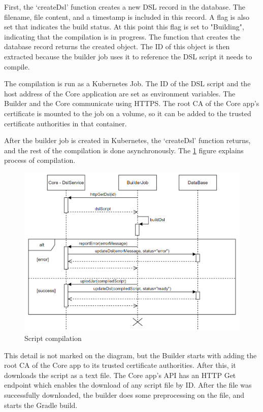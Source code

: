 First, the `createDsl' function creates a new DSL record in the database. The filename, file content, and a timestamp is included in this record. A flag is also set that indicates the build status. At this point this flag is set to "Building", indicating that the compilation is in progress. The function that creates the database record returns the created object. The ID of this object is then extracted because the builder job uses it to reference the DSL script it needs to compile.

The compilation is run as a Kubernetes Job. The ID of the DSL script and the host address of the Core application are set as environment variables. The Builder and the Core communicate using HTTPS. The root CA of the Core app's certificate is mounted to the job on a volume, so it can be added to the trusted certificate authorities in that container. 

After the builder job is created in Kubernetes, the `createDsl' function returns, and the rest of the compilation is done asynchronously. The \ref{fig:seq2} figure explains process of compilation.

\begin{figure}[h]
    \centering
    \includegraphics[width=130mm, keepaspectratio]{seq2.png}
    \caption{Script compilation}
    \label{fig:seq2}
\end{figure}

This detail is not marked on the diagram, but the Builder starts with adding the root CA of the Core app to its trusted certificate authorities. After this, it downloads the script as a text file. The Core app's API has an HTTP Get endpoint which enables the download of any script file by ID. After the file was successfully downloaded, the builder does some preprocessing on the file, and starts the Gradle build. 

